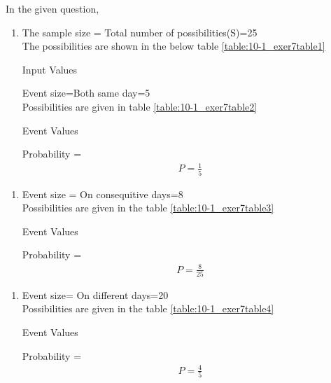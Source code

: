  In the given question,
\begin{enumerate}
\item The sample size = Total number of possibilities(S)=25
\\
The possibilities are shown in the below table \ref{table:10-1_exer7table1}
\begin{table}[ht!]
\centering

\caption{Input Values}
\label{table:10-1_exer7table1}	
\end{table}
Event size=Both same day=5
\\
Possibilities are given in table \ref{table:10-1_exer7table2}
\begin{table}[ht!]
\centering

\caption{Event Values}
\label{table:10-1_exer7table2}	
\end{table}
Probability =
\begin{align}
P=\frac{1}{5}
\end{align}
\end{enumerate}
\begin{enumerate}
\item Event size = On consequitive days=8
\\
Possibilities are given in the table \ref{table:10-1_exer7table3}
\begin{table}[ht!]
\centering

\caption{Event Values}
\label{table:10-1_exer7table3}	
\end{table}
Probability =
\begin{align}
P=\frac{8}{25}
\end{align}
\end{enumerate}
\begin{enumerate}
\item Event size= On different days=20
\\
Possibilities are given in the table \ref{table:10-1_exer7table4}
\begin{table}[ht!]
\centering

\caption{Event Values}
\label{table:10-1_exer7table4}	
\end{table}
Probability =
\begin{align}
P=\frac{4}{5}
\end{align}
\end{enumerate}
